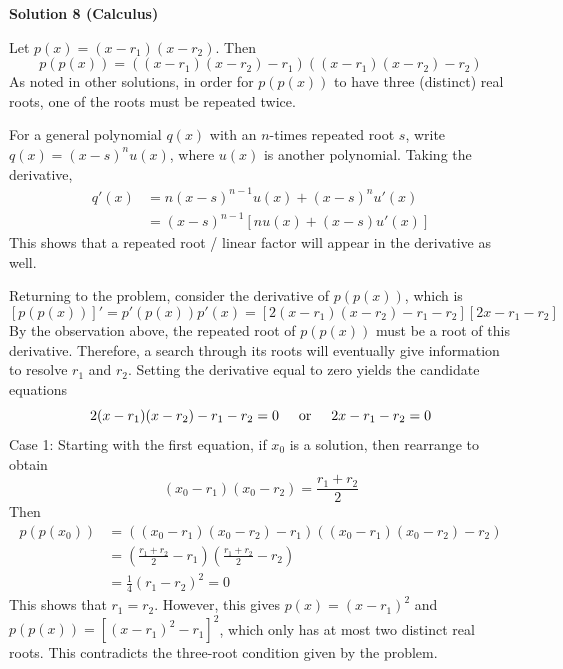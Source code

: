 \begin{enumerate}
 



\textbf{Solution 8 (Calculus)}

Let $p(x)=(x-r_1)(x-r_2)$. Then 
 \[p(p(x)) = ((x-r_1)(x-r_2)-r_1)((x-r_1)(x-r_2)-r_2)\]As noted in other solutions, in order for $p(p(x))$ to have three (distinct) real roots, one of the roots must be repeated twice.

 For a general polynomial $q(x)$ with an $n$-times repeated root $s$, write $q(x)=(x-s)^n u(x)$, where $u(x)$ is another polynomial. Taking the derivative,
 \begin{align*} q'(x)&= n(x-s)^{n-1} u(x) + (x-s)^n u'(x) \\ &= (x-s)^{n-1} \left[nu(x) + (x-s)u'(x)\right] \end{align*}
This shows that a repeated root / linear factor will appear in the derivative as well.

 Returning to the problem, consider the derivative of $p(p(x))$, which is
 \[[p(p(x))]' = p'(p(x))p'(x) = \left[2(x-r_1)(x-r_2)-r_1-r_2\right] \left[2x-r_1-r_2\right]\]By the observation above, the repeated root of $p(p(x))$ must be a root of this derivative. Therefore, a search through its roots will eventually give information to resolve $r_1$ and $r_2$. Setting the derivative equal to zero yields the candidate equations
 \[2(x-r_1)(x-r_2)-r_1-r_2 = 0 \hspace{.5cm}\text{or}\hspace{.5cm} 2x-r_1-r_2 = 0\]Case 1: Starting with the first equation, if $x_0$ is a solution, then rearrange to obtain
 \[(x_0-r_1)(x_0-r_2) = \frac{r_1+r_2}{2}\]Then
 \begin{align*} p(p(x_0)) &= ((x_0-r_1)(x_0-r_2)-r_1)((x_0-r_1)(x_0-r_2)-r_2) \\ &= \left(\frac{r_1+r_2}{2} - r_1\right)\left(\frac{r_1+r_2}{2} - r_2\right) \\ &= \frac{1}{4}(r_1-r_2)^2 = 0 \end{align*}
This shows that $r_1=r_2$. However, this gives $p(x) = (x-r_1)^2$ and $p(p(x)) = \left[(x-r_1)^2-r_1\right]^2$, which only has at most two distinct real roots. This contradicts the three-root condition given by the problem.


\end{enumerate}
